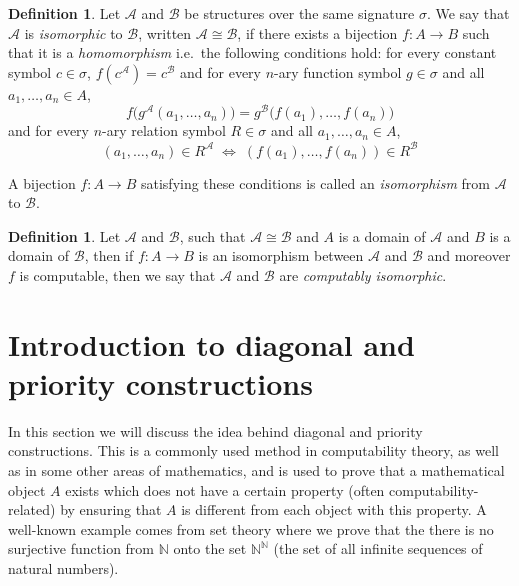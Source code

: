 \documentclass{pracalicmgr2025}
\theoremstyle{plain}            %
\theoremstyle{remark}           %
\theoremstyle{definition}       %
\newtheorem{definition}[theorem]{Definition}
\begin{document}
\begin{definition}
Let $\mathcal{A}$ and $\mathcal{B}$ be structures over the same signature $\sigma$.  
We say that $\mathcal{A}$ is \emph{isomorphic} to $\mathcal{B}$, written 
$\mathcal{A} \cong \mathcal{B}$, if there exists a bijection $f : A \to B$ such that it is a \textit{homomorphism} i.e.\ the following conditions hold: for every constant symbol $c \in \sigma$, $f(c^{\mathcal{A}}) = c^{\mathcal{B}}$ and for every $n$-ary function symbol $g \in \sigma$ and all $a_1, \dots, a_n \in A$,  
$$f\big(g^{\mathcal{A}}(a_1, \dots, a_n)\big) = g^{\mathcal{B}}\big(f(a_1), \dots, f(a_n)\big)$$
and for every $n$-ary relation symbol $R \in \sigma$ and all $a_1, \dots, a_n \in A$,  
$$(a_1, \dots, a_n) \in R^{\mathcal{A}} \;\Longleftrightarrow\; (f(a_1), \dots, f(a_n)) \in R^{\mathcal{B}}$$

\noindent A bijection $f : A \to B$ satisfying these conditions is called an \emph{isomorphism} from $\mathcal{A}$ to $\mathcal{B}$.
\end{definition}

\begin{definition}
    Let $\mathcal{A}$ and $\mathcal{B}$, such that $\mathcal{A} \cong \mathcal{B}$ and $A$ is a domain of $\mathcal{A}$ and $B$ is a domain of $\mathcal{B}$, then if $f: A \to B$ is an isomorphism between $\mathcal{A}$ and $\mathcal{B}$ and moreover $f$ is computable, then we say that $\mathcal{A}$ and $\mathcal{B}$ are \emph{computably isomorphic}.
\end{definition}

\section{Introduction to diagonal and priority constructions} \label{diagonalization}

In this section we will discuss the idea behind diagonal and priority constructions. This is a commonly used method in computability theory, as well as in some other areas of mathematics, and is used to prove that a mathematical object $A$ exists which does not have a certain property (often
computability-related) by ensuring that $A$ is different from each object with this property. A well-known example comes from set theory where we prove that the there is no surjective
function from $\mathbb{N}$ onto the set $\mathbb{N}^{\mathbb{N}}$ (the set of all infinite sequences of natural numbers)\cite{Settheory}.
\end{document}
